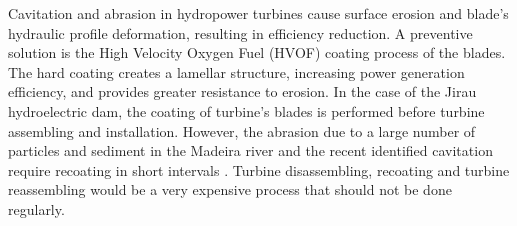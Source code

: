 Cavitation and abrasion in hydropower turbines cause surface erosion and
blade's hydraulic profile deformation, resulting in efficiency
reduction. A preventive solution is the High Velocity Oxygen Fuel (HVOF) coating
process of the blades. The hard coating creates a lamellar structure,
increasing power generation efficiency, and provides greater
resistance to erosion. In the case of the Jirau hydroelectric dam, the coating
of turbine's blades is performed before turbine assembling and
installation. However, the abrasion due to a large number
of particles and sediment in the Madeira river and the recent identified
cavitation require recoating in short intervals \citep{santa2009slurry}. Turbine
disassembling, recoating and turbine reassembling would be a very expensive
process that should not be done regularly.


